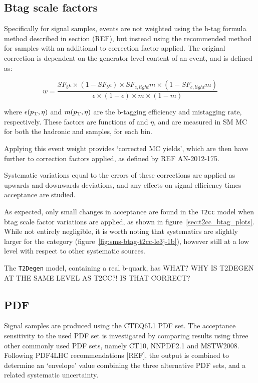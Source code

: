 \subsection{Btag scale factors}
Specifically for \FASTSIM signal samples, events are not weighted using the 
b-tag formula method described in section (REF), but instead using the 
recommended method for \FULLSIM samples with an additional \FULLSIM to \FASTSIM 
correction factor applied. The original correction is dependent on the generator
level content of an event, and is defined as:

\begin{equation}
w = \frac{SF_b \epsilon \times (1-SF_b \epsilon) \times SF_{c,light} m \times (1
-SF_{c,light} m)}{\epsilon \times (1-\epsilon) \times m \times (1-m)}
\label{eq:btag_fullsim_weight}
\end{equation}

where $\epsilon({p_{\text T}}, \eta)$ and $m({p_{\text T}}, \eta)$ are the b-tagging efficiency and 
mistagging rate, respectively. These factors are functions of \Pt and $\eta$, and
are measured in SM MC for both the hadronic and \mj samples, for each \HT bin.

Applying this event weight provides `corrected MC yields', which are then 
have further \FASTSIM to \FULLSIM correction factors applied, as defined by REF 
AN-2012-175.

Systematic variations equal to the errors of these corrections are applied as 
upwards and downwards deviations, and any effects on signal efficiency times 
acceptance are studied.

As expected, only small changes in acceptance are found in the \texttt{T2cc} 
model when btag scale factor variations are applied, as shown in
figure~\ref{sec:t2cc_btag_plots}. While not entirely negligible, it is worth 
noting that systematics are slightly larger for the  category
(figure~\ref{fig:sms-btag-t2cc-le3j-1b}), however still at a low level with 
respect to other systematic sources.

The \texttt{T2Degen} model, containing a real b-quark, has WHAT?
WHY IS T2DEGEN AT THE SAME LEVEL AS T2CC?! IS THAT CORRECT?


\subsection{PDF}
Signal samples are produced using the \textsc{CTEQ6L1} PDF set. The acceptance 
sensitivity to the used PDF set is investigated by comparing results using three
other commonly used PDF sets, namely \textsc{CT10}, \textsc{NNPDF2.1} and
\textsc{MSTW2008}. Following PDF4LHC recommendations [REF], the output is 
combined to determine an `envelope' value combining the three alternative PDF 
sets, and a related systematic uncertainty.


